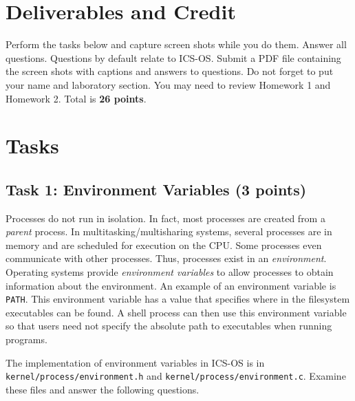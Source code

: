 \documentclass[a4paper, 11pt,oneside]{article}
\begin{document}
\section{Deliverables and Credit}
Perform the tasks below and capture screen shots while you do them. Answer
all questions. Questions by default relate to ICS-OS. Submit a PDF file containing the screen shots with captions 
and answers to questions. Do not forget to put your name and laboratory
section. You may need to review Homework 1 and Homework 2. Total is \textbf{26 points}.

\section{Tasks}

\subsection*{Task 1: Environment Variables (3 points)} 
Processes do not run in isolation. In fact, most processes are created from a \textit{parent} process. 
In multitasking/multisharing systems, several processes are in memory and are scheduled for execution 
on the CPU. Some processes even communicate with other processes. Thus, processes exist in an \textit{environment}. Operating systems provide \textit{environment variables} to allow processes to obtain information about the environment. An example of an environment variable is \texttt{PATH}. This 
environment variable has a value that specifies where in the filesystem executables 
can be found. A shell process can then use this environment variable so that users need not specify the absolute path to executables when running programs.

The implementation of environment variables in ICS-OS is in \texttt{kernel/process/environment.h} and 
\texttt{kernel/process/environment.c}. Examine these files and answer the following questions.



\noindent{}
\end{document}

